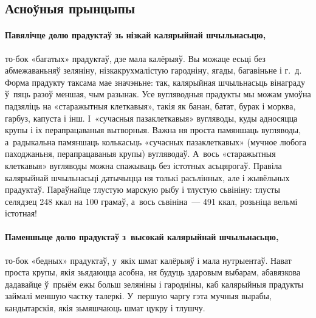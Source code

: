 \subsection{Асноўныя прынцыпы}

\paragraph{Павялічце долю прадуктаў зь нізкай калярыйнай шчыльнасьцю,} то-бок «багатых» прадуктаў, дзе мала калёрыяў. Вы можаце есьці без абмежаваньняў зеляніну, нізкакрухмалістую гародніну, ягады, багавіньне і г.~д. Форма прадукту таксама мае значэньне: так, калярыйная шчыльнасьць вінаграду ў~пяць разоў меншая, чым разынак. Усе вугляводныя прадукты мы можам умоўна падзяліць на «старажытныя клеткавыя», такія як банан, батат, бурак і морква, гарбуз, капуста і інш. І~«сучасныя пазаклеткавыя» вугляводы, куды адносяцца крупы і іх перапрацаваныя вытворныя. Важна ня проста памяншаць вугляводы, а~радыкальна памяншаць колькасьць «сучасных пазаклеткавых» (мучное любога паходжаньня, перапрацаваныя крупы) вугляводаў. А~вось «старажытныя клеткавыя» вугляводы можна спажываць без істотных асьцярогаў. Правіла калярыйнай шчыльнасьці датычыцца ня толькі расьлінных, але і жывёльных прадуктаў. Параўнайце тлустую марскую рыбу і тлустую сьвініну: тлусты селядзец 248 ккал на 100 грамаў, а~вось сьвініна~--- 491 ккал, розьніца вельмі істотная!

\paragraph{Паменшыце долю прадуктаў з~высокай калярыйнай шчыльнасьцю,} то-бок «бедных» прадуктаў, у~якіх шмат калёрыяў і мала нутрыентаў. Нават проста крупы, якія зьядаюцца асобна, ня будуць здаровым выбарам, абавязкова дадавайце ў~прыём ежы больш зеляніны і гародніны, каб калярыйныя прадукты займалі меншую частку талеркі. У~першую чаргу гэта мучныя вырабы, кандытарскія, якія зьмяшчаюць шмат цукру і тлушчу.


